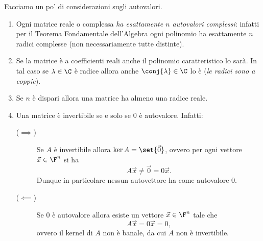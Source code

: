 Facciamo un po' di considerazioni sugli autovalori.
\begin{enumerate}[(1)]
    \item Ogni matrice reale o complessa \emph{ha esattamente $n$ autovalori complessi}: infatti per il Teorema Fondamentale dell'Algebra ogni polinomio ha esattamente $n$ radici complesse (non necessariamente tutte distinte).
    \item Se la matrice è a coefficienti reali anche il polinomio caratteristico lo sarà. In tal caso se $\lambda \in \C$ è radice allora anche $\conj{\lambda} \in \C$ lo è (\emph{le radici sono a coppie}).
    \item Se $n$ è dispari allora una matrice ha almeno una radice reale.
    \item Una matrice è invertibile se e solo se $0$ è autovalore. Infatti: \begin{description}
        \item[($\implies$)] Se $A$ è invertibile allora $\ker A = \set{\vec 0}$, ovvero per ogni vettore $\vec x \in \F^n$ si ha \[
            A\vec x \neq \vec 0 = 0\vec x.
        \]  Dunque in particolare nessun autovettore ha come autovalore $0$.
        \item[($\impliedby$)] Se $0$ è autovalore allora esiste un vettore $\vec x \in \F^n$ tale che \[
            A\vec x = 0\vec x = 0,
        \] ovvero il kernel di $A$ non è banale, da cui $A$ non è invertibile.
    \end{description} 
\end{enumerate}